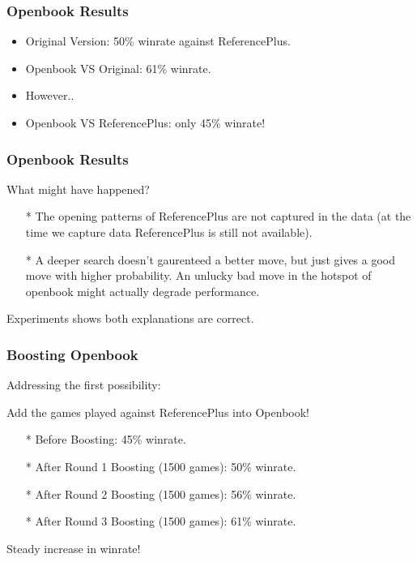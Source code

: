 \documentclass[10pt]{beamer}
\begin{document}
	\begin{frame}
		\frametitle{Openbook Results}
		
		\begin{itemize}
		\item Original Version: \textcolor{fgreen}{50\%} winrate against ReferencePlus.\pause
		\item Openbook VS Original: \textcolor{fgreen}{61\%} winrate.\pause
		\item However..\pause
		\item Openbook VS ReferencePlus: only \textcolor{dred}{45\%} winrate!
		\end{itemize}
	\end{frame}
	
	\begin{frame}
		\frametitle{Openbook Results}
		
		What might have happened?\pause
		
		\begin{itemize}
		\item[*] The opening patterns of ReferencePlus are not captured in the data 
		(at the time we capture data ReferencePlus is still not available).\pause
		\item[*] A deeper search doesn't gaurenteed a better move, but just gives a good move with higher probability. 
		An unlucky bad move in the hotspot of openbook might actually degrade performance.\pause
		\end{itemize}
		
		Experiments shows both explanations are correct.
	\end{frame}
	
	\begin{frame}
		\frametitle{Boosting Openbook}
		
		Addressing the first possibility:\pause
		
		\textcolor{fgreen}{Add the games played against ReferencePlus into Openbook!}\pause
		
		\begin{itemize}
		\item[*] Before Boosting: \textcolor{dred}{45\%} winrate.\pause
		\item[*] After Round 1 Boosting (1500 games): \textcolor{fgreen}{50\%} winrate.\pause
		\item[*] After Round 2 Boosting (1500 games): \textcolor{fgreen}{56\%} winrate.\pause
		\item[*] After Round 3 Boosting (1500 games): \textcolor{fgreen}{61\%} winrate.\pause
		\end{itemize}
		
		Steady increase in winrate!
	\end{frame}
	
\end{document}
